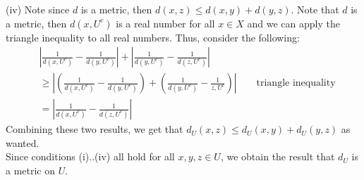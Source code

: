 \documentclass{article}
\begin{document}
    (iv) Note since $d$ is a metric, then $d(x,z)\leq d(x,y) + d(y,z)$. Note that $d$ is a metric, then $d(x,U^c)$ is a real number for
    all $x\in X$ and we can apply the triangle inequality to all real numbers. Thus, consider the following:
    \begin{align*}
        &|\frac{1}{d(x,U^c)} - \frac{1}{d(y,U^c)}| + |\frac{1}{d(y,U^c)} - \frac{1}{d(z,U^c)}| \\
        &\geq |(\frac{1}{d(x,U^c)} - \frac{1}{d(y,U^c)}) + (\frac{1}{d(y,U^c)} - \frac{1}{z,U^c})|\qquad\text{triangle inequality}\\
        &= |\frac{1}{d(x,U^c)} - \frac{1}{d(z,U^c)}|
    \end{align*}
    Combining these two results, we get that $d_U(x,z)\leq d_U(x,y)+d_U(y,z)$ as wanted.\\
    Since conditions (i)..(iv) all hold for all $x,y,z\in U$, we obtain the result that $d_U$ is a metric on $U$.\\
\end{document}
